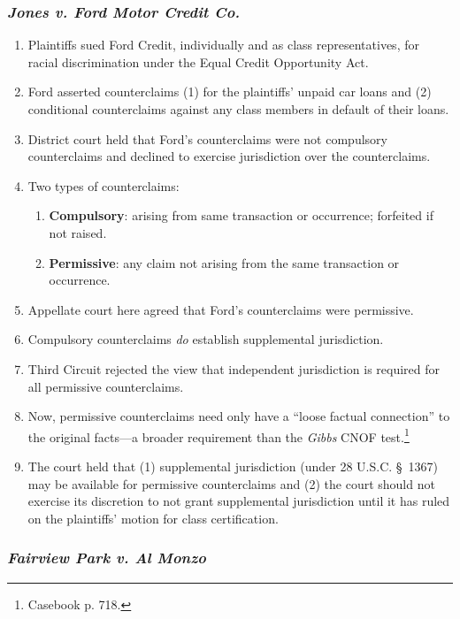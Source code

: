 \subsubsection{\emph{Jones v. Ford Motor Credit Co.}}

\begin{enumerate}
    \item Plaintiffs sued Ford Credit, individually and as class representatives, for racial discrimination under the Equal Credit Opportunity Act. 
    \item Ford asserted counterclaims (1) for the plaintiffs' unpaid car loans and (2) conditional counterclaims against any class members in default of their loans.
    \item District court held that Ford's counterclaims were not compulsory counterclaims and declined to exercise jurisdiction over the counterclaims.
    \item Two types of counterclaims:
    \begin{enumerate}
        \item \textbf{Compulsory}: arising from same transaction or occurrence; forfeited if not raised.
        \item \textbf{Permissive}: any claim not arising from the same transaction or occurrence.
    \end{enumerate}
    \item Appellate court here agreed that Ford's counterclaims were permissive.
    \item Compulsory counterclaims \emph{do} establish supplemental jurisdiction.
    \item Third Circuit rejected the view that independent jurisdiction is required for all permissive counterclaims.
    \item Now, permissive counterclaims need only have a ``loose factual connection'' to the original facts---a broader requirement than the \emph{Gibbs} CNOF test.\footnote{Casebook p. 718.}
    \item The court held that (1) supplemental jurisdiction (under 28 U.S.C. § 1367) may be available for permissive counterclaims and (2) the court should not exercise its discretion to not grant supplemental jurisdiction until it has ruled on the plaintiffs' motion for class certification.
\end{enumerate}

\subsubsection{\emph{Fairview Park v. Al Monzo}}

